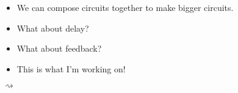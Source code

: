 \documentclass{beamer}
\begin{document}
    \begin{frame}
        \begin{center}
        \end{center}
    \end{frame}
    \begin{frame}
        \begin{center}
        \end{center}
    \end{frame}
    \begin{frame}
        \begin{center}
        \end{center}
    \end{frame}
    \begin{frame}
        \begin{center}
        \end{center}
    \end{frame}
    \begin{frame}
        \begin{center}
        \end{center}
    \end{frame}
    \begin{frame}
        \begin{center}
        \end{center}
    \end{frame}
    \begin{frame}
        \begin{itemize}
            \item We can \alert{compose} circuits together to make \alert{bigger} circuits. \pause
            \item What about \alert{delay?} \pause
            \item What about \alert{feedback?} \pause
            \item This is what I'm working on! \pause
        \end{itemize}

        \begin{center}

            \vspace{1em}

            \pause
            \(\rightsquigarrow\)
        \end{center}
    \end{frame}
    \begin{frame}
        \begin{center}
        \end{center}
    \end{frame}
\end{document}
